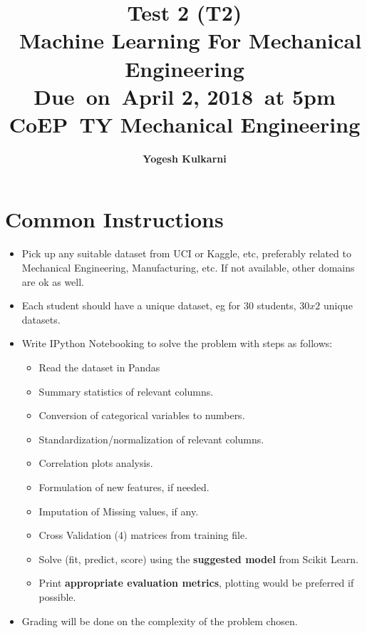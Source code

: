 



\newcommand{\hmwkTitle}{Machine Learning For Mechanical Engineering}
\newcommand{\hmwkDueDate}{April 2, 2018}
\newcommand{\hmwkClass}{Test 2 (T2)}
\newcommand{\hmwkClassTime}{TY Mechanical Engineering}
\newcommand{\hmwkClassInstructor}{CoEP}
\newcommand{\hmwkAuthorName}{\textbf{Yogesh Kulkarni}}

\title{
    \textmd{\textbf{\hmwkClass\\\ \hmwkTitle}}\\
    {Due\ on\ \hmwkDueDate\ at 5pm}\\
    \vspace{0.1in}\large{{\hmwkClassInstructor\ \hmwkClassTime}}
}

\author{\hmwkAuthorName}
\date{}



\maketitle

\section{Common Instructions}
\begin{itemize}
\item Pick up any suitable dataset from UCI or Kaggle, etc, preferably related to Mechanical Engineering, Manufacturing, etc.  If not available, other domains are ok as well.
\item Each student should have a unique dataset, eg for 30 students, $30x2$ unique datasets.
\item Write IPython Notebooking to solve the problem with steps as follows:
\begin{itemize}
\item Read the dataset in Pandas
\item Summary statistics of relevant columns.
\item Conversion of categorical variables to numbers.
\item Standardization/normalization of relevant columns.
\item Correlation plots analysis.
\item Formulation of new features, if needed.
\item Imputation of Missing values, if any.
\item Cross Validation (4) matrices from training file.
\item Solve (fit, predict, score) using the \textbf{suggested model} from Scikit Learn.
\item Print \textbf{appropriate evaluation metrics}, plotting would be preferred if possible.
\end{itemize}
\item Grading will be done on the complexity of the problem chosen.
\end{itemize}

